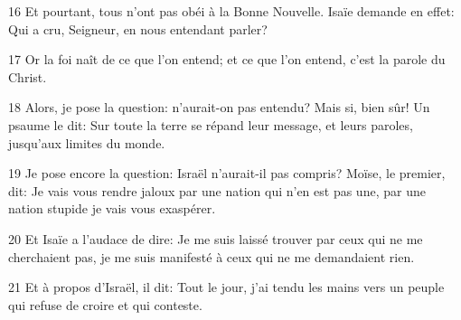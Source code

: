 
16 Et pourtant, tous n’ont pas obéi à la Bonne Nouvelle. Isaïe demande en effet: Qui a cru, Seigneur, en nous entendant parler?

17 Or la foi naît de ce que l’on entend; et ce que l’on entend, c’est la parole du Christ.

18 Alors, je pose la question: n’aurait-on pas entendu? Mais si, bien sûr! Un psaume le dit: Sur toute la terre se répand leur message, et leurs paroles, jusqu’aux limites du monde.

19 Je pose encore la question: Israël n’aurait-il pas compris? Moïse, le premier, dit: Je vais vous rendre jaloux par une nation qui n’en est pas une, par une nation stupide je vais vous exaspérer.

20 Et Isaïe a l’audace de dire: Je me suis laissé trouver par ceux qui ne me cherchaient pas, je me suis manifesté à ceux qui ne me demandaient rien.

21 Et à propos d’Israël, il dit: Tout le jour, j’ai tendu les mains vers un peuple qui refuse de croire et qui conteste.